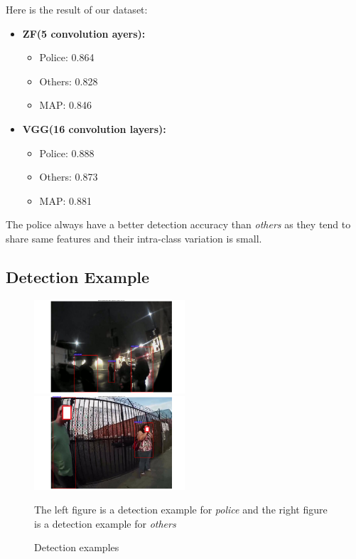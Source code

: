 \documentclass[a4paper]{article}
\begin{document}
Here is the result of our dataset:
\begin{itemize}
\item{\bf ZF(5 convolution ayers):}
\begin{itemize}
\item Police: 0.864
\item Others: 0.828 
\item MAP: 0.846
\end{itemize}
\item{\bf VGG(16 convolution layers):}
\begin{itemize}
\item Police: 0.888
\item Others: 0.873
\item MAP: 0.881
\end{itemize}
\end{itemize}
The police always have a better detection accuracy than \textit{others} as they tend to share same features and their intra-class variation is small.\\
\subsection{Detection Example}
\begin{figure}[H]
\centering
\begin{minipage}{\textwidth}
\includegraphics[width=0.5\textwidth]{Detect_Police.png}
\includegraphics[width=0.5\textwidth]{Detect_Others.png}\\
\footnotesize{The left figure is a detection example for \textit{police} and the right figure is a detection example for \textit{others} \par}
\caption{Detection examples}
\label{Detection}
\end{minipage}
\end{figure}
\end{document}
